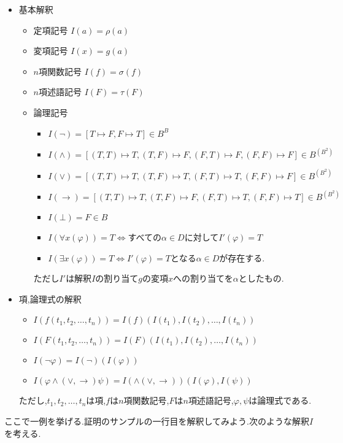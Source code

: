 \documentclass[10pt,b5paper,papersize,dvipdfmx]{jsbook}
\begin{document}
\begin{itemize}
\item 基本解釈
\begin{itemize}
\item 定項記号 $I(a)=\rho(a)$
\item 変項記号 $I(x)=g(a)$
\item $n$項関数記号 $I(f)=\sigma(f)$
\item $n$項述語記号 $I(F)=\tau(F)$
\item 論理記号
\begin{itemize}
\item $I(\lnot)=[T\mapsto F,F\mapsto T]\in B^B$
\item $I(\land)=[(T,T)\mapsto T,(T,F)\mapsto F,(F,T)\mapsto F,(F,F)\mapsto F]\in B^{(B^2)}$
\item $I(\lor)=[(T,T)\mapsto T,(T,F)\mapsto T,(F,T)\mapsto T,(F,F)\mapsto F]\in B^{(B^2)}$
\item $I(\to)=[(T,T)\mapsto T,(T,F)\mapsto F,(F,T)\mapsto T,(F,F)\mapsto T]\in B^{(B^2)}$
\item $I(\bot)=F\in B$
\item $I(\forall x(\varphi))=T\Leftrightarrow$すべての$\alpha \in D$に対して$I'(\varphi)=T$
\item $I(\exists x(\varphi))=T\Leftrightarrow$$I'(\varphi)=T$となる$\alpha \in D$が存在する.
\end{itemize}
ただし$I'$は解釈$I$の割り当て$g$の変項$x$への割り当てを$\alpha$としたもの.
\end{itemize}
\item 項,論理式の解釈
\begin{itemize}
\item $I(f(t_1,t_2,\dots,t_n))=I(f)(I(t_1),I(t_2),\dots,I(t_n))$
\item $I(F(t_1,t_2,\dots,t_n))=I(F)(I(t_1),I(t_2),\dots,I(t_n))$
\item $I(\lnot \varphi)=I(\lnot)(I(\varphi))$
\item $I(\varphi \land(\lor,\to)\psi)=I(\land(\lor,\to))(I(\varphi),I(\psi))$
\end{itemize}
ただし,$t_1,t_2,\dots,t_n$は項,$f$は$n$項関数記号,$F$は$n$項述語記号,$\varphi,\psi$は論理式である.
\end{itemize}
ここで一例を挙げる.証明のサンプルの一行目を解釈してみよう.次のような解釈$I$を考える.
\end{document}
